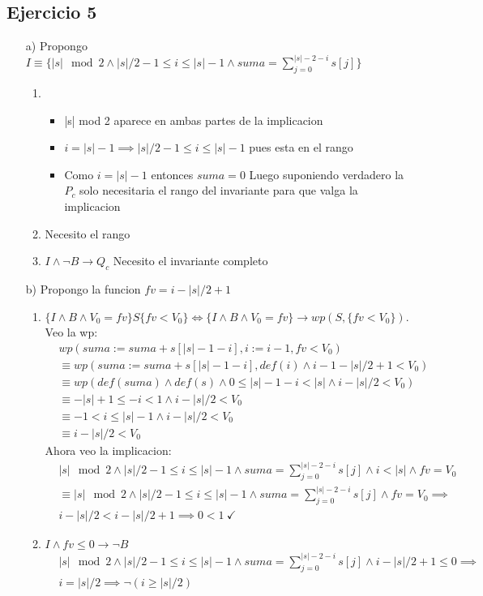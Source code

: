 \documentclass{article}
\begin{document}
\subsection*{Ejercicio 5}
\begin{itemize}
    \item [a) ] Propongo $I\equiv \{|s| \mod 2\land |s|/2-1\leq i\leq|s|-1\land suma=\sum\limits_{j=0}^{|s|-2-i}s[j]\}$
    \begin{enumerate}
        \item \tuno
        \begin{itemize}
            \item |s| mod 2 aparece en ambas partes de la implicacion
            \item $i=|s|-1 \implies |s|/2-1\leq i\leq|s|-1$ pues esta en el rango
            \item Como $i=|s|-1$ entonces $suma=0$
            Luego suponiendo verdadero la $P_c$ solo necesitaria el rango del invariante para que valga la implicacion
        \end{itemize}
        \item \tdos Necesito el rango
        \item $I\land \neg B \to Q_c$ Necesito el invariante completo
    \end{enumerate}
\item [b) ] Propongo la funcion $fv=i-|s|/2+1$
\begin{enumerate}
    \item $\{I\land B\land V_0=fv\}S\{fv<V_0\}\Longleftrightarrow \{I\land B\land V_0=fv\}\to wp(S,\{fv<V_0\})$. Veo la wp:\\
    \cont\begin{align}
        &wp(suma:=suma+s[|s|-1-i],i:=i-1,fv<V_0)\\
        &\equiv wp(suma:=suma+s[|s|-1-i], def(i)\land i-1-|s|/2+1<V_0)\\
        &\equiv wp(def(suma)\land def(s)\land 0\leq |s|-1-i<|s| \land i-|s|/2<V_0)\\
        &\equiv -|s|+1\leq -i<1 \land i-|s|/2<V_0\\
        &\equiv -1<i\leq |s|-1 \land i-|s|/2<V_0\\
        &\equiv i-|s|/2<V_0
    \end{align}
    Ahora veo la implicacion:
    \cont\begin{align}
        &|s| \mod 2\land |s|/2-1\leq i\leq|s|-1\land suma=\sum\limits_{j=0}^{|s|-2-i}s[j]\land i<|s| \land fv=V_0\\
        &\equiv |s| \mod 2\land |s|/2-1\leq i\leq|s|-1\land suma=\sum\limits_{j=0}^{|s|-2-i}s[j]\land fv=V_0\implies\\
        &i-|s|/2<i-|s|/2+1\implies 0<1 \ \checkmark
    \end{align}
    \item $ I\land fv\leq0 \to \neg B$
    \cont\begin{align}
        &|s| \mod 2\land |s|/2-1\leq i\leq|s|-1\land suma=\sum\limits_{j=0}^{|s|-2-i}s[j] \land i-|s|/2+1\leq0 \implies\\
        &
        i=|s|/2 \implies \neg (i\geq|s|/2)
    \end{align}
\end{enumerate}
\end{itemize}
\end{document}
